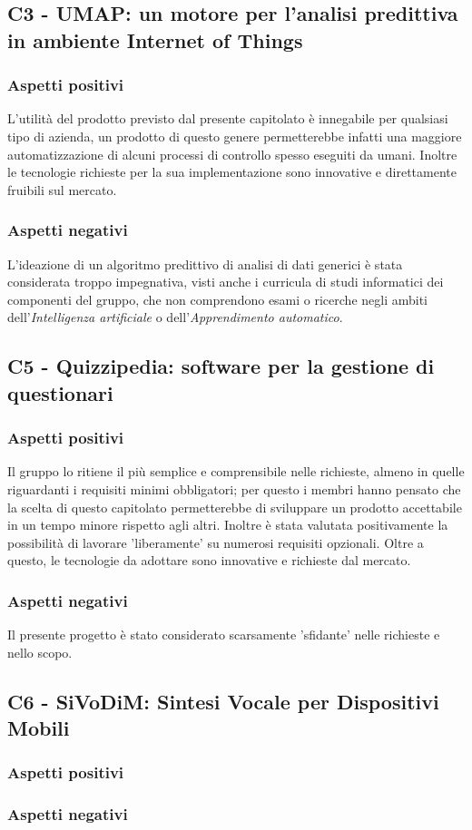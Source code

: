 \subsection{C3 - UMAP: un motore per l'analisi predittiva in ambiente Internet of Things}
\subsubsection{Aspetti positivi}
L'utilit\`a del prodotto previsto dal presente capitolato \`e innegabile per qualsiasi tipo di azienda,
un prodotto di questo genere permetterebbe infatti una maggiore automatizzazione di alcuni
processi di controllo spesso eseguiti da umani.
Inoltre le tecnologie richieste per la sua implementazione sono innovative e direttamente fruibili sul mercato.

\subsubsection{Aspetti negativi}
L'ideazione di un algoritmo predittivo di analisi di dati generici è stata considerata troppo impegnativa,
visti anche i curricula di studi informatici dei componenti del gruppo, che non comprendono esami
o ricerche negli ambiti dell'\textit{Intelligenza artificiale} o dell'\textit{Apprendimento automatico}.


\subsection{C5 - Quizzipedia: software per la gestione di questionari}
\subsubsection{Aspetti positivi}
Il gruppo lo ritiene il pi\`u semplice e comprensibile nelle richieste, almeno in quelle
riguardanti i requisiti minimi obbligatori; per questo i membri hanno pensato che la scelta 
di questo capitolato permetterebbe di sviluppare un prodotto accettabile in un tempo minore
rispetto agli altri. 
Inoltre \`e stata valutata positivamente la possibilit\`a di lavorare 'liberamente'
su numerosi requisiti opzionali. 
Oltre a questo, le tecnologie da adottare sono innovative e richieste dal mercato.
\subsubsection{Aspetti negativi}
Il presente progetto \`e stato considerato scarsamente 'sfidante' nelle richieste e nello scopo.

\subsection{C6 - SiVoDiM: Sintesi Vocale per Dispositivi Mobili}
\subsubsection{Aspetti positivi}
\subsubsection{Aspetti negativi}


